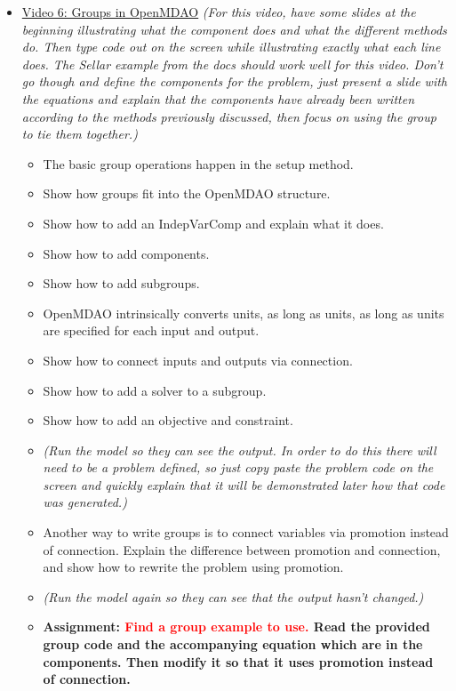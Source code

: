 \documentclass[12pt, letterpaper]{article}
\begin{document}
\begin{itemize}
	\item \underline{Video 6: Groups in OpenMDAO} \textit{(For this video, have some slides at the beginning illustrating what the component does 			and what the different methods do. Then type code out on the screen while illustrating exactly what each line does. The Sellar example from the 			docs should work well for this video. Don’t go though and define the components for the problem, just present a slide with the equations and 				explain that the components have already been written according to the methods previously discussed, then focus on using the group to tie them 		together.)}
		\begin{itemize}
			\item The basic group operations happen in the setup method.
			\item Show how groups fit into the OpenMDAO structure.
			\item Show how to add an IndepVarComp and explain what it does.
			\item Show how to add components.
			\item Show how to add subgroups.
			\item OpenMDAO intrinsically converts units, as long as units, as long as units are specified for each input and output.
			\item Show how to connect inputs and outputs via connection.
			\item Show how to add a solver to a subgroup.
			\item Show how to add an objective and constraint.
			\item \textit{(Run the model so they can see the output. In order to do this there will need to be a problem defined, so just copy paste the 				problem code on the screen and quickly explain that it will be demonstrated later how that code was generated.)}
			\item Another way to write groups is to connect variables via promotion instead of connection. Explain the difference between promotion 					and connection, and show how to rewrite the problem using promotion.
			\item \textit{(Run the model again so they can see that the output hasn’t changed.)}
			\item \textbf{Assignment: \textcolor{red}{Find a group example to use.} Read the provided group code and the accompanying equation which are in the 					components. Then modify it so that it uses promotion instead of connection.}
		\end{itemize}

\end{itemize}
\end{document}
